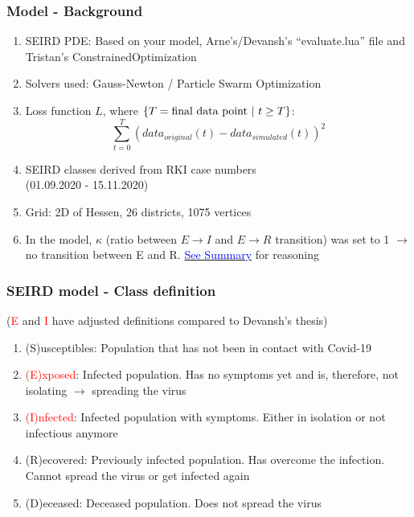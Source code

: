 \documentclass{beamer}
\begin{document}
\begin{frame}
	\frametitle{Model - Background}
	\begin{enumerate}[$\bullet$]
		\item SEIRD PDE: Based on your model, Arne's/Devansh's ``evaluate.lua'' file and Tristan's ConstrainedOptimization
		\item Solvers used: Gauss-Newton / Particle Swarm Optimization
		\item Loss function $L$, where $\{T = \text{final data point \textbar \space} t \geq T\}$:$$\sum_{t=0}^{T}(data_{original}(t) - data_{simulated}(t))^2$$ 
		\item SEIRD classes derived from RKI case numbers\\(01.09.2020 - 15.11.2020)
		\item Grid: 2D of Hessen, 26 districts, 1075 vertices
		\item In the model, $\kappa$ (ratio between $E\rightarrow I$ and $E\rightarrow R$ transition) was set to 1
			$\rightarrow$ no transition between E and R. \hyperlink{sec:StateModel}{\textcolor{blue}{See Summary}} for reasoning
	\end{enumerate}

\end{frame}

\begin{frame}
	\frametitle{SEIRD model - Class definition}
	(\textcolor{red}{E} and \textcolor{red}{I} have adjusted definitions compared to Devansh's thesis)\newline
	\begin{enumerate}[$\bullet$]
		\item (S)usceptibles: Population that has not been in contact with Covid-19
		\item \textcolor{red}{(E)xposed}: Infected population. Has no symptoms yet and is, therefore, not isolating $\rightarrow$ spreading the virus
		\item \textcolor{red}{(I)nfected}: Infected population with symptoms. Either in isolation or not infectious anymore
		\item (R)ecovered: Previously infected population. Has overcome the infection. Cannot spread the virus or get infected again
		\item (D)eceased: Deceased population. Does not spread the virus
	\end{enumerate}

\end{frame}
\end{document}
